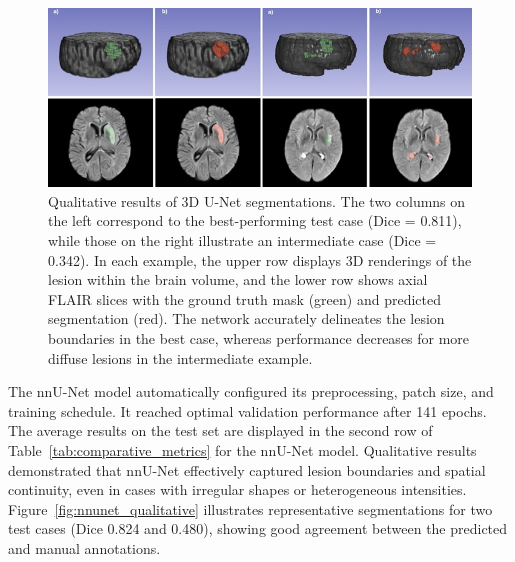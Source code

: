\documentclass[12pt]{article}
\begin{document}
\begin{figure}[tp]
    \centering
    \includegraphics[width=\textwidth]{figures/Figure 2.jpg}
    \caption{Qualitative results of 3D U-Net segmentations. The two columns on the left correspond to the best-performing test case (Dice = 0.811), while those on the right illustrate an intermediate case (Dice = 0.342). In each example, the upper row displays 3D renderings of the lesion within the brain volume, and the lower row shows axial FLAIR slices with the ground truth mask (green) and predicted segmentation (red). The network accurately delineates the lesion boundaries in the best case, whereas performance decreases for more diffuse lesions in the intermediate example.}\label{fig:unet_qualitative}
\end{figure}


%
The nnU-Net model automatically configured its preprocessing, patch size, and training schedule. It reached optimal validation performance after 141 epochs. %
The average results on the test set are displayed in the second row of Table~\ref{tab:comparative_metrics} for the nnU-Net model.
%
Qualitative results demonstrated that nnU-Net effectively captured lesion boundaries and spatial continuity, even in cases with irregular shapes or heterogeneous intensities. Figure~\ref{fig:nnunet_qualitative} illustrates representative segmentations for two test cases (Dice 0.824 and 0.480), showing good agreement between the predicted and manual annotations.
\end{document}
